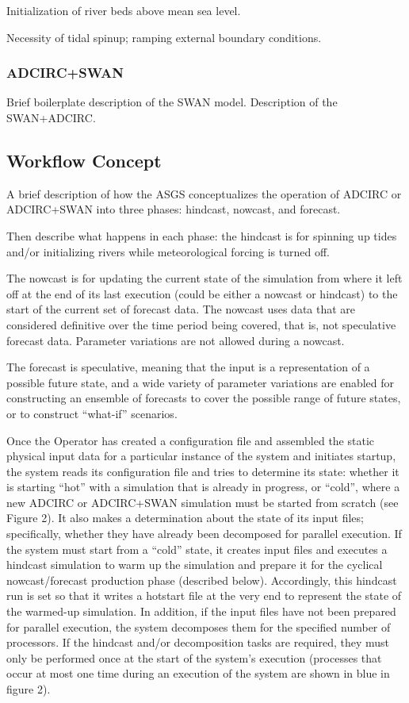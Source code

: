 \documentclass[12pt]{article}
\begin{document}
Initialization of river beds above mean sea level. 

Necessity of tidal spinup; ramping external boundary conditions. 

\subsubsection{ADCIRC+SWAN}

Brief boilerplate description of the SWAN model. Description of the SWAN+ADCIRC.

\subsection{Workflow Concept}

A brief description of how the ASGS conceptualizes the operation of 
ADCIRC or ADCIRC+SWAN into three phases: hindcast, nowcast, and 
forecast. 

Then describe what happens in each phase: the hindcast is for 
spinning up tides and/or initializing rivers while meteorological 
forcing is turned off. 

The nowcast is for updating the current state of the simulation from 
where it left off at the end of its last execution (could be either 
a nowcast or hindcast) to the start of the current set of forecast 
data. The nowcast uses data that are considered definitive over the 
time period being covered, that is, not speculative forecast data. 
Parameter variations are not allowed during a nowcast. 

The forecast is speculative, meaning that the input is a representation
of a possible future state, and a wide variety of parameter variations
are enabled for constructing an ensemble of forecasts to cover the possible
range of future states, or to construct ``what-if'' scenarios.

Once the Operator has created a configuration file and assembled the 
static physical input data for a particular instance of the system 
and initiates startup, the system reads its configuration file and 
tries to determine its state: whether it is starting “hot” with a 
simulation that is already in progress, or “cold”, where a new 
ADCIRC or ADCIRC+SWAN simulation must be started from scratch (see 
Figure 2). It also makes a determination about the state of its 
input files; specifically, whether they have already been decomposed 
for parallel execution. If the system must start from a “cold” 
state, it creates input files and executes a hindcast simulation to 
warm up the simulation and prepare it for the cyclical 
nowcast/forecast production phase (described below). Accordingly, 
this hindcast run is set so that it writes a hotstart file at the 
very end to represent the state of the warmed-up simulation. In 
addition, if the input files have not been prepared for parallel 
execution, the system decomposes them for the specified number of 
processors. If the hindcast and/or decomposition tasks are required, 
they must only be performed once at the start of the system's 
execution (processes that occur at most one time during an execution 
of the system are shown in blue in figure 2).
\end{document}
